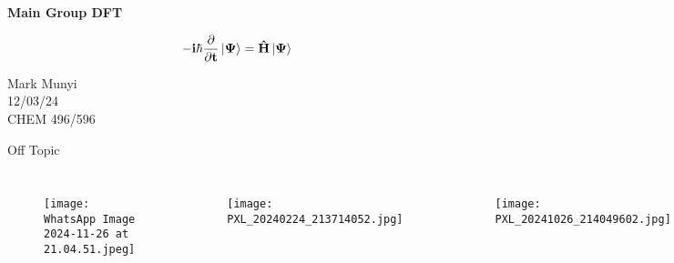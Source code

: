 \documentclass[10pt, aspectratio=169]{beamer}
\begin{document}
\begin{frame}
 
  \vspace{1cm}
  \begin{center}
    {\LARGE \textbf{Main Group DFT}} 

    \vspace{1cm}
    \begin{equation*}
        \Huge\mathbf{{-i\hbar\frac{\partial}{\partial t}\ket{\Psi} = \hat{H}\ket{\Psi}}}
    \end{equation*}
    \vspace{1cm}

    {\color{lightblue}\large Mark Munyi \\ 12/03/24 \\ CHEM 496/596} 
  \end{center}
\end{frame}

\begin{frame}{Off Topic}
\begin{columns}
    \begin{figure}
        \centering
        \texttt{[image: WhatsApp Image 2024-11-26 at 21.04.51.jpeg]}
        \caption*{}
        \label{fig:enter-label}
    \end{figure}
    
    \begin{figure}
        \centering
        \texttt{[image: PXL\_20240224\_213714052.jpg]}
        \caption*{}
        \label{fig:enter-label}
    \end{figure}
    \begin{figure}
        \centering
        \texttt{[image: PXL\_20241026\_214049602.jpg]}
        \caption*{}
        \label{fig:enter-label}
    \end{figure}
\end{columns}

\end{frame}
\end{document}
